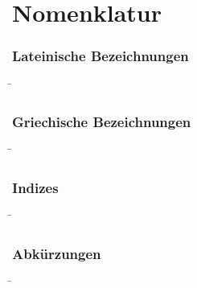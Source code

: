 \chapter*{Nomenklatur}


\subsection*{Lateinische Bezeichnungen}
\begin{tabbing}
\hspace*{2cm}\=\kill
\end{tabbing}



\subsection*{Griechische Bezeichnungen}
\begin{tabbing}
\hspace*{2cm}\=\kill
\end{tabbing}



\subsection*{Indizes}
\begin{tabbing}
\hspace*{2cm}\=\kill
\end{tabbing}



\subsection*{Abk\"urzungen}
\begin{tabbing}
\hspace*{2cm}\=\kill
\end{tabbing}

